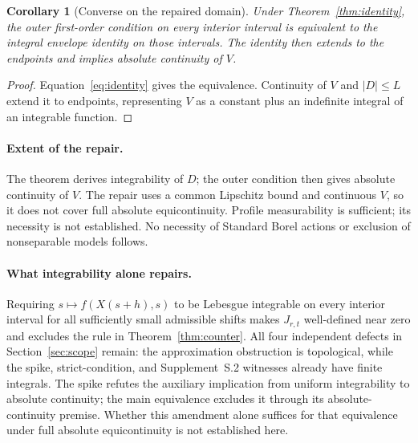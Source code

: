\documentclass[11pt]{article}
\newtheorem{corollary}[theorem]{Corollary}
\theoremstyle{remark}\newtheorem{remark}[theorem]{Remark}
\begin{document}
\begin{corollary}[Converse on the repaired domain]\label{cor:converse}
Under Theorem~\ref{thm:identity}, the outer first-order condition on every interior interval is equivalent to the integral envelope identity on those intervals. The identity then extends to the endpoints and implies absolute continuity of $V$.
\end{corollary}
\begin{proof}
Equation~\eqref{eq:identity} gives the equivalence. Continuity of $V$ and $|D|\le L$ extend it to endpoints, representing $V$ as a constant plus an indefinite integral of an integrable function.
\end{proof}

\paragraph{Extent of the repair.}
The theorem derives integrability of $D$; the outer condition then gives absolute continuity of $V$. The repair uses a common Lipschitz bound and continuous $V$, so it does not cover full absolute equicontinuity. Profile measurability is sufficient; its necessity is not established. No necessity of Standard Borel actions or exclusion of nonseparable models follows.

\paragraph{What integrability alone repairs.}
Requiring $s\mapsto f(X(s+h),s)$ to be Lebesgue integrable on every interior interval for all sufficiently small admissible shifts makes $J_{r,t}$ well-defined near zero and excludes the rule in Theorem~\ref{thm:counter}. All four independent defects in Section~\ref{sec:scope} remain: the approximation obstruction is topological, while the spike, strict-condition, and Supplement~S.2 witnesses already have finite integrals. The spike refutes the auxiliary implication from uniform integrability to absolute continuity; the main equivalence excludes it through its absolute-continuity premise. Whether this amendment alone suffices for that equivalence under full absolute equicontinuity is not established here.
\end{document}
